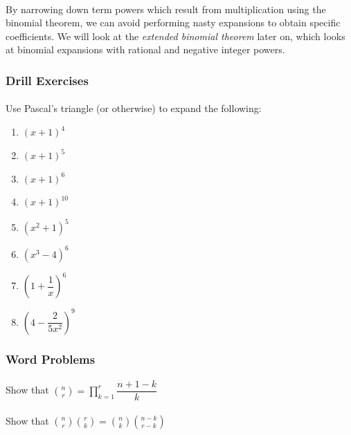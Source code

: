 \documentclass[12pt, a4paper, titlepage, twoside]{article}
\begin{document}
	\paragraph{}
	By narrowing down term powers which result from multiplication using the binomial theorem, we can avoid performing 
	nasty expansions to obtain specific coefficients. We will look at the \textit{extended binomial theorem} later on, which looks at
	binomial expansions with rational and negative integer powers.


	\subsubsection*{Drill Exercises}	
	
	\paragraph{}
	 Use Pascal's triangle (or otherwise) to expand the following:
	
	\begin{multicols}{2}
		\begin{enumerate}[label=\textbf{(\alph*)}]
			\item $(x+1)^4$
			\item $(x+1)^5$
			\item $(x+1)^6$
			\item $(x+1)^{10}$
			\item $(x^2+1)^5$
			\item $(x^3 - 4)^6$
			\item $\left(1 + \dfrac{1}{x}\right)^6$
			\item $\left(4 - \dfrac{2}{5x^2}\right)^9$
		\end{enumerate}	
	\end{multicols}

	\subsubsection*{Word Problems}	
	
	\paragraph{}
	 Show that $\displaystyle {n \choose r} = \prod_{k=1}^r \dfrac{n+1 - k}{k}$
	
	\paragraph{}
	 Show that $\displaystyle {n \choose r} {r \choose k} = {n \choose k} {{n-k} \choose {r-k}}$
	
\end{document}
